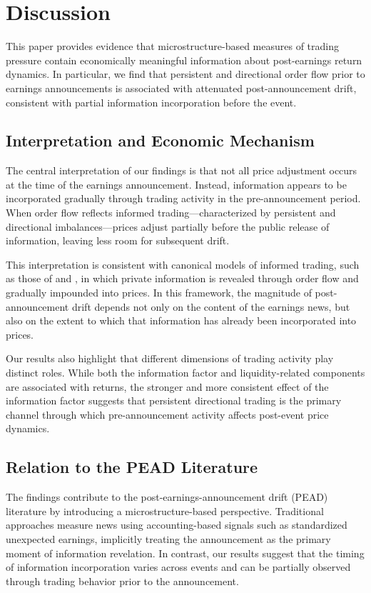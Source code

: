 \section{Discussion}

This paper provides evidence that microstructure-based measures of trading pressure contain economically meaningful information about post-earnings return dynamics. In particular, we find that persistent and directional order flow prior to earnings announcements is associated with attenuated post-announcement drift, consistent with partial information incorporation before the event.

\subsection{Interpretation and Economic Mechanism}

The central interpretation of our findings is that not all price adjustment occurs at the time of the earnings announcement. Instead, information appears to be incorporated gradually through trading activity in the pre-announcement period. When order flow reflects informed trading—characterized by persistent and directional imbalances—prices adjust partially before the public release of information, leaving less room for subsequent drift.

This interpretation is consistent with canonical models of informed trading, such as those of \citet{Kyle1985} and \citet{Hasbrouck1991}, in which private information is revealed through order flow and gradually impounded into prices. In this framework, the magnitude of post-announcement drift depends not only on the content of the earnings news, but also on the extent to which that information has already been incorporated into prices.

Our results also highlight that different dimensions of trading activity play distinct roles. While both the information factor and liquidity-related components are associated with returns, the stronger and more consistent effect of the information factor suggests that persistent directional trading is the primary channel through which pre-announcement activity affects post-event price dynamics.

\subsection{Relation to the PEAD Literature}

The findings contribute to the post-earnings-announcement drift (PEAD) literature by introducing a microstructure-based perspective. Traditional approaches measure news using accounting-based signals such as standardized unexpected earnings, implicitly treating the announcement as the primary moment of information revelation. In contrast, our results suggest that the timing of information incorporation varies across events and can be partially observed through trading behavior prior to the announcement.

